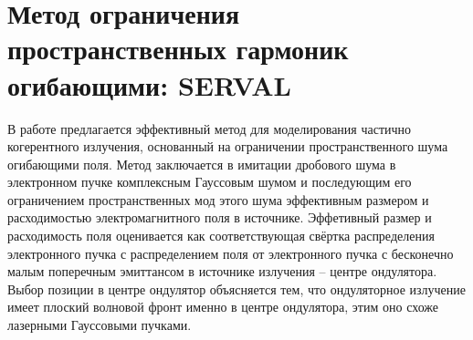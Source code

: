 \section{Метод ограничения пространственных гармоник огибающими: SERVAL}
В работе предлагается эффективный метод для моделирования частично когерентного излучения, основанный на ограничении пространственного шума огибающими поля. Метод заключается в имитации дробового шума в электронном пучке комплексным Гауссовым шумом и последующим его ограничением пространственных мод этого шума эффективным размером и расходимостью электромагнитного поля в источнике. Эффетивный размер и расходимость поля оценивается как соответствующая свёртка распределения электронного пучка с распределением поля от электронного пучка с бесконечно малым поперечным эмиттансом в источнике излучения -- центре ондулятора. Выбор позиции в центре ондулятор объясняется тем, что ондуляторное излучение имеет плоский волновой фронт именно в центре ондулятора, этим оно схоже лазерными Гауссовыми пучками.

